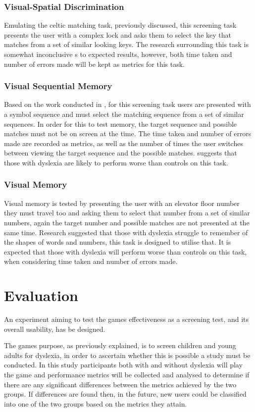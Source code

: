 \documentclass[journal]{IEEEtran}
\begin{document}
\subsubsection{Visual-Spatial Discrimination} 
Emulating the celtic matching task, previously discussed, this screening task presents the user with a complex lock and asks them to select the key that matches from a set of similar looking keys. The research surrounding this task is somewhat inconclusive s to expected results, however, both time taken and number of errors made will be kept as metrics for this task.

\subsubsection{Visual Sequential Memory} 
Based on the work conducted in \cite{sequential}, for this screening task users are presented with a symbol sequence and must select the matching sequence from a set of similar sequences. In order for this to test memory, the target sequence and possible matches must not be on screen at the time. The time taken and number of errors made are recorded as metrics, as well as the number of times the user switches between viewing the target sequence and the possible matches.
\cite{sequential} suggests that those with dyslexia are likely to perform worse than controls on this task.

\subsubsection{Visual Memory}
Visual memory is tested by presenting the user with an elevator floor number they must travel too and asking them to select that number from a set of similar numbers, again the target number and possible matches are not presented at the same time. Research suggested that those with dyslexia struggle to remember of the shapes of words and numbers, this task is designed to utilise that. It is expected that those with dyslexia will perform worse than controls on this task, when considering time taken and number of errors made.

\section{Evaluation}
\label{sec:evaluation}
An experiment aiming to test the games effectiveness as a screening test, and its overall usability, has be designed. 

The games purpose, as previously explained, is to screen children and young adults for dyslexia, in order to ascertain whether this is possible a study must be conducted. In this study participants both with and without dyslexia will play the game and performance metrics will be collected and analysed to determine if there are any significant differences between the metrics achieved by the two groups. If differences are found then, in the future, new users could be classified into one of the two groups based on the metrics they attain.
\end{document}
